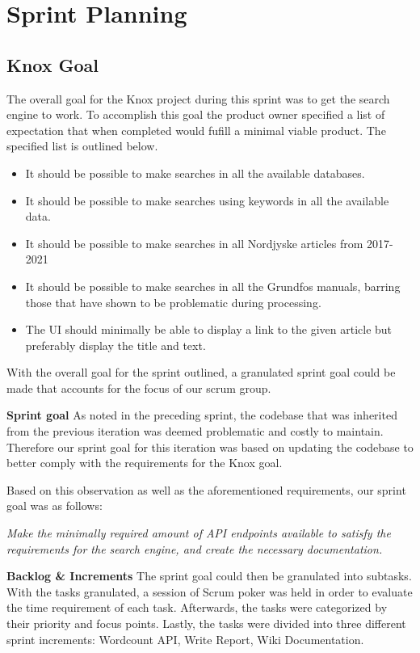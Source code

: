 \section{Sprint Planning}
\subsection{Knox Goal}
The overall goal for the Knox project during this sprint was to get the search engine to work. To accomplish this goal the product owner specified a list of expectation that when completed would fufill a minimal viable product. The specified list is outlined below.
\begin{itemize}
	\item It should be possible to make searches in all the available databases.
	\item It should be possible to make searches using keywords in all the available data.
	\item It should be possible to make searches in all Nordjyske articles from 2017-2021
	\item It should be possible to make searches in all the Grundfos manuals, barring those that have shown to be problematic during processing.
	\item The UI should minimally be able to display a link to the given article but preferably display the title and text.
\end{itemize}

With the overall goal for the sprint outlined, a granulated sprint goal could be made that accounts for the focus of our scrum group.


\textbf{Sprint goal}
As noted in the preceding sprint, the codebase that was inherited from the previous iteration was deemed problematic and costly to maintain. Therefore our sprint goal for this iteration was based on updating the codebase to better comply with the requirements for the Knox goal.


Based on this observation as well as the aforementioned requirements, our sprint goal was as follows:


\textit{Make the minimally required amount of API endpoints available to satisfy the requirements for the search engine, and create the necessary documentation.}


\textbf{Backlog \& Increments}
The sprint goal could then be granulated into subtasks. With the tasks granulated, a session of Scrum poker was held in order to evaluate the time requirement of each task. Afterwards, the tasks were categorized by their priority and focus points. Lastly, the tasks were divided into three different sprint increments: Wordcount API, Write Report, Wiki Documentation. 



